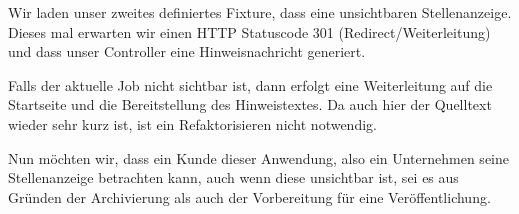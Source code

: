 \tddred

Wir laden unser zweites definiertes Fixture, dass eine unsichtbaren Stellenanzeige. Dieses mal erwarten wir einen HTTP Statuscode 301 (Redirect/Weiterleitung) und dass unser Controller eine Hinweisnachricht generiert.

%                                                                                                                                                                    
\begin{ruby}[label=app/controllers/jobs\_controller.rb]
 
    \PY{o}{[}\PY{o}{]}
    
        
\end{ruby}

\tddgreen
Falls der aktuelle Job nicht sichtbar ist, dann erfolgt eine Weiterleitung auf die Startseite und die Bereitstellung des Hinweistextes.
\tddrefactor
Da auch hier der Quelltext wieder sehr kurz ist, ist ein Refaktorisieren nicht notwendig.

Nun möchten wir, dass ein Kunde dieser Anwendung, also ein Unternehmen seine Stellenanzeige betrachten kann, auch wenn diese unsichtbar ist, sei es aus Gründen der Archivierung als auch der Vorbereitung für eine Veröffentlichung.

